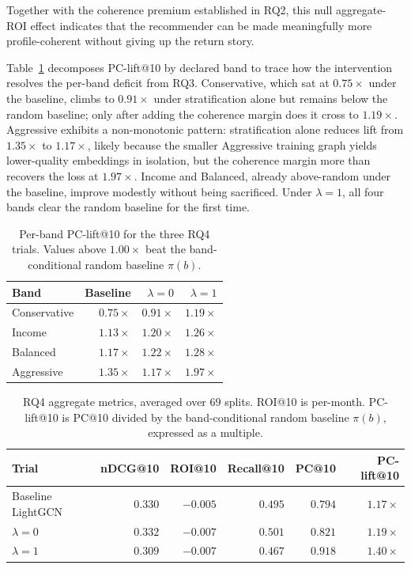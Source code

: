 Together with the coherence premium established in RQ2, this null aggregate-ROI effect indicates that the recommender can be made meaningfully more profile-coherent without giving up the return story.

Table~\ref{tab:rq4-per-band} decomposes PC-lift@10 by declared band to trace how the intervention resolves the per-band deficit from RQ3. Conservative, which sat at $0.75\times$ under the baseline, climbs to $0.91\times$ under stratification alone but remains below the random baseline; only after adding the coherence margin does it cross to $1.19\times$. Aggressive exhibits a non-monotonic pattern: stratification alone reduces lift from $1.35\times$ to $1.17\times$, likely because the smaller Aggressive training graph yields lower-quality embeddings in isolation, but the coherence margin more than recovers the loss at $1.97\times$. Income and Balanced, already above-random under the baseline, improve modestly without being sacrificed. Under $\lambda = 1$, all four bands clear the random baseline for the first time.

\begin{table}[H]
\centering
\small
\begin{tabular}{lrrr}
\toprule
Band & Baseline & $\lambda = 0$ & $\lambda = 1$ \\
\midrule
Conservative & $0.75\times$ & $0.91\times$ & $1.19\times$ \\
Income       & $1.13\times$ & $1.20\times$ & $1.26\times$ \\
Balanced     & $1.17\times$ & $1.22\times$ & $1.28\times$ \\
Aggressive   & $1.35\times$ & $1.17\times$ & $1.97\times$ \\
\bottomrule
\end{tabular}
\caption{Per-band PC-lift@10 for the three RQ4 trials. Values above $1.00\times$ beat the band-conditional random baseline $\pi(b)$.}
\label{tab:rq4-per-band}
\end{table}

\begin{table}[!t]
\centering
\small
\begin{tabular}{lrrrrr}
\toprule
Trial & nDCG@10 & ROI@10 & Recall@10 & PC@10 & PC-lift@10 \\
\midrule
Baseline LightGCN      & $0.330$ & $-0.005$ & $0.495$ & $0.794$ & $1.17\times$ \\
$\lambda = 0$ & $0.332$ & $-0.007$ & $0.501$ & $0.821$ & $1.19\times$ \\
$\lambda = 1$ & $0.309$ & $-0.007$ & $0.467$ & $0.918$ & $1.40\times$ \\
\bottomrule
\end{tabular}
\caption{RQ4 aggregate metrics, averaged over 69 splits. ROI@10 is per-month. PC-lift@10 is PC@10 divided by the band-conditional random baseline $\pi(b)$, expressed as a multiple.}
\label{tab:rq4-aggregate}
\end{table}

